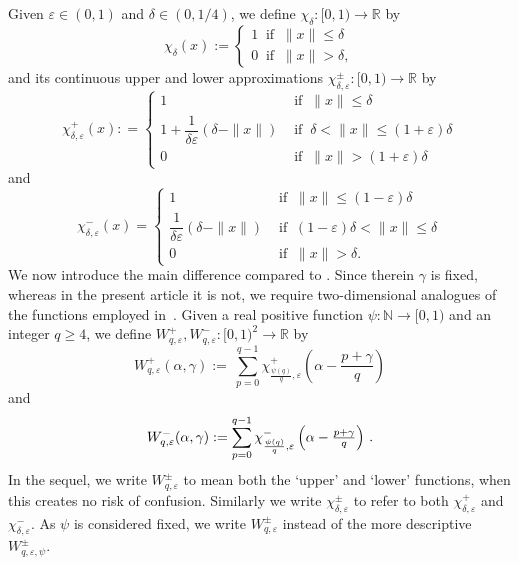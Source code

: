 \documentclass[12pt, reqno]{amsart}
\theoremstyle{definition}
\theoremstyle{remark}
\numberwithin{equation}{section}
\def\alp{{\alpha}} \def\bfalp{{\boldsymbol \alpha}}
\def\del{{\delta}} \def\Del{{\Delta}}
\def\eps{\varepsilon}
\def\leq{\leqslant}
\def\geq{\geqslant}
\def \bR {\mathbb R}
\begin{document}
Given $\eps \in (0,1)$ and 
$\del \in (0,1/4)$,  we define  
$\chi_{\delta}: [0,1) \to \bR$ 
by   
\[
\chi_{\delta}(x):= \begin{cases}1 
\ \text{ if }  \ \|x\|\leq \delta  \\[1ex]
0 \ \text{ if } \  \|x\|>\delta,  \end{cases}   
\]
and its continuous upper and lower approximations 
$\chi_{\delta, \varepsilon}^\pm 
: [0,1)\to  \bR$  
by
\[
\chi_{\delta, \varepsilon}^+(x):
= \begin{cases} 1 & \text{\  if   }  \  \|x\|\leq \delta \\[1ex]
1+ \dfrac{1}{\delta\varepsilon}(\delta-\|x\|) &\text{\   if }  \  \delta < \|x\| \leq (1+\varepsilon)\delta \\[1.3ex]
0 & \text{\ if } \  \|x\|>(1+\varepsilon)\delta \end{cases}
\]
and
$$   
\chi_{\delta, \varepsilon}^-(x)
= \begin{cases} 1 & \text{\  if } \  \|x\|\leq (1 -\varepsilon)\delta  \\[1ex]
\dfrac{1}{\delta\varepsilon}(\delta-\|x\|) &\text{\   if } \  (1-\varepsilon)\delta < \|x\| \leq \delta \\[1.3ex]
0  & \text{\ if } \ \|x\|>\delta. \end{cases} $$
We now introduce the main difference compared to \cite{PVZZ2022}. Since therein $\gamma$ is fixed, whereas in the present article it is not, we require two-dimensional analogues of the functions employed in~\cite{PVZZ2022}. Given a real positive function $\psi:\mathbb{N}\rightarrow [0,1)$ and an integer $q\geq 4$, we define
$W_{q,\varepsilon}^{+}, W_{q,\varepsilon}^{-}: [0,1)^2\to\bR$ by \vspace{2mm}
\begin{equation*} %
W_{q,\varepsilon}^{+}(\alp,\gamma) :=\ %
\sum_{p=0}^{q-1}\chi_{\frac{\psi(q)}{q}, \varepsilon}^{+}\left(\textstyle{\alp- \frac{p+\gamma}{q}}\right)
\end{equation*}
and
\begin{equation*} 
W_{q,\varepsilon}^{-}(\alp,\gamma)  :=\sum_{p=0}^{q-1}\chi_{\frac{\psi(q)}{q}, \varepsilon}^{-}\left(\textstyle{\alp- \frac{p+\gamma}{q}}\right)   \, . \vspace{2mm}
\end{equation*}
In the sequel, we write 
$ W_{q,\varepsilon}^{\pm}$ to mean both the `upper' and `lower' functions, when this creates no  risk of confusion. Similarly we  write $\chi_{\delta, \varepsilon}^{\pm}$ to refer to both $\chi_{\delta, \varepsilon}^{+}$ and $\chi_{\delta, \varepsilon}^{-}$. As $\psi$ is considered fixed, we write $W_{q,\varepsilon}^{\pm}$ instead of the more descriptive $W_{q,\varepsilon, \psi}^{\pm}$.
\end{document}
